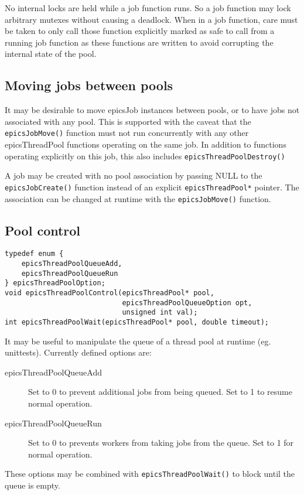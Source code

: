 No internal locks are held while a job function runs.
So a job function may lock arbitrary mutexes without causing a deadlock.
When in a job function, care must be taken to only call those function explicitly
marked as safe to call from a running job function as these functions
are written to avoid corrupting the internal state of the pool.


\subsection{Moving jobs between pools}

It may be desirable to move epicsJob instances between pools, or to
have jobs not associated with any pool. This is supported with the
caveat that the \verb|epicsJobMove()| function must not run concurrently
with any other epicsThreadPool functions operating on the same job.
In addition to functions operating explicitly on this job, this also includes
\verb|epicsThreadPoolDestroy()|

A job may be created with no pool association by passing NULL to the \verb|epicsJobCreate()|
function instead of an explicit \verb|epicsThreadPool*| pointer. The association can be changed
at runtime with the \verb|epicsJobMove()| function.


\subsection{Pool control}

\begin{verbatim}
typedef enum {
    epicsThreadPoolQueueAdd,
    epicsThreadPoolQueueRun
} epicsThreadPoolOption;
void epicsThreadPoolControl(epicsThreadPool* pool,
                            epicsThreadPoolQueueOption opt,
                            unsigned int val);
int epicsThreadPoolWait(epicsThreadPool* pool, double timeout);
\end{verbatim}



It may be useful to manipulate the queue of a thread pool at runtime
(eg. unittests). Currently defined options are:
\begin{description}
\item [{epicsThreadPoolQueueAdd}] Set to 0 to prevent additional jobs from
being queued. Set to 1 to resume normal operation.
\item [{epicsThreadPoolQueueRun}] Set to 0 to prevents workers from taking
jobs from the queue. Set to 1 for normal operation.
\end{description}
These options may be combined with \verb|epicsThreadPoolWait()| to block
until the queue is empty.

